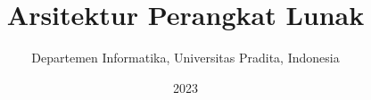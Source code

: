 \documentclass[a4paper,12pt]{book}
\begin{document}
\title{Arsitektur Perangkat Lunak}
\author{Departemen Informatika, Universitas Pradita, Indonesia}
\date{2023}

\frontmatter
\maketitle
\tableofcontents

\mainmatter















\backmatter
{}


\end{document}
